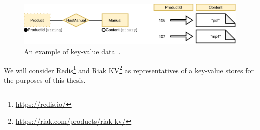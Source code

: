 \begin{figure}[ht]
\centering
\includegraphics[scale=0.66]{img/example-keyval.pdf}
\caption{An example of key-value data~\cite{inference}.}
\label{fig:keyvaluedata}
\end{figure}

We will consider Redis\footnote{\url{https://redis.io/}} and Riak KV\footnote{\url{https://riak.com/products/riak-kv/}} as representatives of a key-value stores for the purposes of this thesis.
